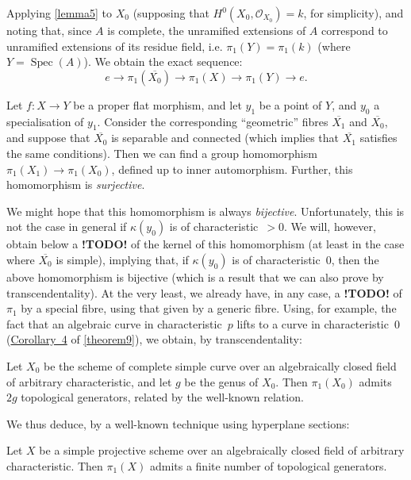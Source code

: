 \documentclass{article}
\theoremstyle{plain}
\newenvironment{corollary}[1]
  {\renewcommand\theinnercustomcorollary{#1}\innercustomcorollary}
  {\endinnercustomcorollary}
\theoremstyle{definition}
\newcommand{\sh}{\mathscr}
\newcommand{\kres}{\kappa}
\DeclareMathOperator{\Spec}{Spec}
\newcommand{\todo}{\textbf{ !TODO! }}
\newcommand{\oldpage}[1]{\marginpar{\footnotesize$\Big\vert$ \textit{p.~#1}}}
\begin{document}
Applying \cref{lemma5} to $X_0$ (supposing that $H^0(X_0,\sh{O}_{X_0})=k$, for simplicity), and noting that, since $A$ is complete, the unramified extensions of $A$ correspond to unramified extensions of its residue field, i.e. $\pi_1(Y)=\pi_1(k)$ (where $Y=\Spec(A)$).
We obtain the exact sequence:
\[
  e \to \pi_1(\overline{X_0}) \to \pi_1(X) \to \pi_1(Y) \to e.
\]

\begin{corollary}{2}
\label{theorem12corollary2}
  Let $f\colon X\to Y$ be a proper flat morphism, and let $y_1$ be a point of $Y$, and $y_0$ a specialisation of $y_1$.
  Consider the corresponding ``geometric'' fibres $\overline{X_1}$ and $\overline{X_0}$, and suppose that $\overline{X_0}$ is separable and connected (which implies that $\overline{X_1}$ satisfies the same conditions).
  Then we can find a group homomorphism $\pi_1(X_1)\to\pi_1(X_0)$, defined up to inner automorphism.
  Further, this homomorphism is \emph{surjective}.
\end{corollary}

\oldpage{182-25}
We might hope that this homomorphism is always \emph{bijective}.
Unfortunately, this is not the case in general if $\kres(y_0)$ is of characteristic~$>0$.
We will, however, obtain below a \todo of the kernel of this homomorphism (at least in the case where $\overline{X_0}$ is simple), implying that, if $\kres(y_0)$ is of characteristic~$0$, then the above homomorphism is bijective (which is a result that we can also prove by transcendentality).
At the very least, we already have, in any case, a \todo of $\pi_1$ by a special fibre, using that given by a generic fibre.
Using, for example, the fact that an algebraic curve in characteristic~$p$ lifts to a curve in characteristic~$0$ (\hyperref[theorem9corollary4]{Corollary~4} of \cref{theorem9}), we obtain, by transcendentality:

\begin{corollary}{3}
\label{theorem12corollary3}
  Let $X_0$ be the scheme of complete simple curve over an algebraically closed field of arbitrary characteristic, and let $g$ be the genus of $X_0$.
  Then $\pi_1(X_0)$ admits $2g$ topological generators, related by the well-known relation.
\end{corollary}

We thus deduce, by a well-known technique using hyperplane sections:

\begin{corollary}{4}
\label{theorem12corollary4}
  Let $X$ be a simple projective scheme over an algebraically closed field of arbitrary characteristic.
  Then $\pi_1(X)$ admits a finite number of topological generators.
\end{corollary}
\end{document}

